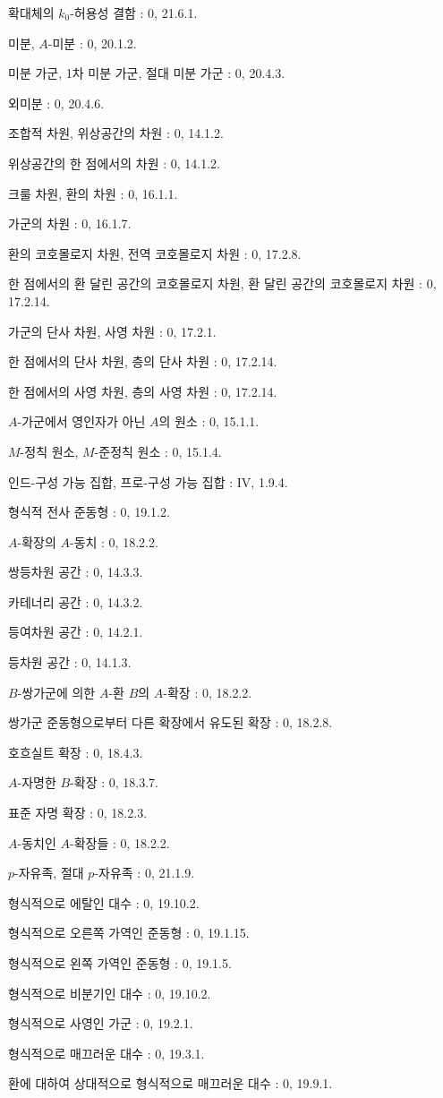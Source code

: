 확대체의 $k_0$-허용성 결함 : 0, 21.6.1.\par
미분, $A$-미분 : 0, 20.1.2.\par
미분 가군, 1차 미분 가군, 절대 미분 가군 : 0, 20.4.3.\par
외미분 : 0, 20.4.6.\par
조합적 차원, 위상공간의 차원 : 0, 14.1.2.\par
위상공간의 한 점에서의 차원 : 0, 14.1.2.\par
크룰 차원, 환의 차원 : 0, 16.1.1.\par
가군의 차원 : 0, 16.1.7.\par
환의 코호몰로지 차원, 전역 코호몰로지 차원 : 0, 17.2.8.\par
한 점에서의 환 달린 공간의 코호몰로지 차원, 환 달린 공간의
코호몰로지 차원 : 0, 17.2.14.\par

\clearpage
{}
가군의 단사 차원, 사영 차원 : 0, 17.2.1.\par
한 점에서의 단사 차원, 층의 단사 차원 : 0, 17.2.14.\par
한 점에서의 사영 차원, 층의 사영 차원 : 0, 17.2.14.\par

$A$-가군에서 영인자가 아닌 $A$의 원소 : 0, 15.1.1.\par
$M$-정칙 원소, $M$-준정칙 원소 : 0, 15.1.4.\par
인드-구성 가능 집합, 프로-구성 가능 집합 : IV, 1.9.4.\par
형식적 전사 준동형 : 0, 19.1.2.\par
$A$-확장의 $A$-동치 : 0, 18.2.2.\par
쌍등차원 공간 : 0, 14.3.3.\par
카테너리 공간 : 0, 14.3.2.\par
등여차원 공간 : 0, 14.2.1.\par
등차원 공간 : 0, 14.1.3.\par
$B$-쌍가군에 의한 $A$-환 $B$의 $A$-확장 : 0, 18.2.2.\par
쌍가군 준동형으로부터 다른 확장에서 유도된 확장 : 0, 18.2.8.\par
호흐실트 확장 : 0, 18.4.3.\par
$A$-자명한 $B$-확장 : 0, 18.3.7.\par
표준 자명 확장 : 0, 18.2.3.\par
$A$-동치인 $A$-확장들 : 0, 18.2.2.\par

$p$-자유족, 절대 $p$-자유족 : 0, 21.1.9.\par
형식적으로 에탈인 대수 : 0, 19.10.2.\par
형식적으로 오른쪽 가역인 준동형 : 0, 19.1.15.\par
형식적으로 왼쪽 가역인 준동형 : 0, 19.1.5.\par
형식적으로 비분기인 대수 : 0, 19.10.2.\par
형식적으로 사영인 가군 : 0, 19.2.1.\par
형식적으로 매끄러운 대수 : 0, 19.3.1.\par
환에 대하여 상대적으로 형식적으로 매끄러운 대수 : 0, 19.9.1.\par

